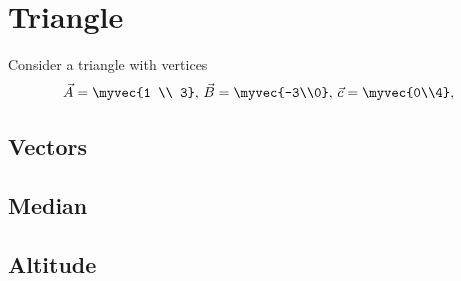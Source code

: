 \documentclass[11pt]{book}
\begin{document}
\frontmatter
\tableofcontents
\setcounter{page}{1}
\mainmatter
\chapter{Triangle}
Consider a triangle with vertices
\begin{align}
\label{eq:tri-pts}
\vec{A}=\myvec{1 \\ 3},\,
\vec{B}=\myvec{-3\\0},\,
	\vec{c}=\myvec{0\\4},\,
\end{align}

\section{Vectors}
\section{Median}
\section{Altitude}
\end{document}
